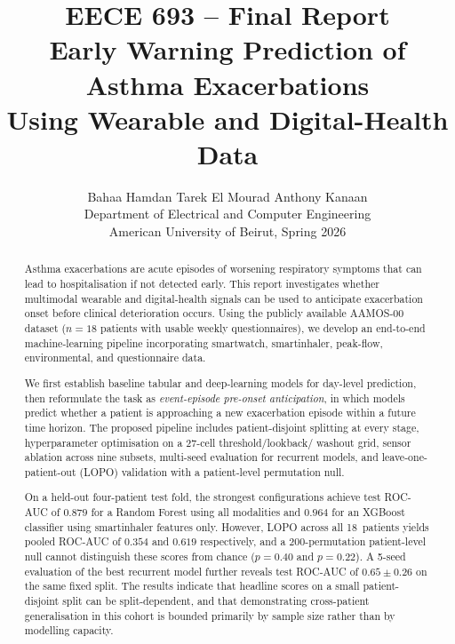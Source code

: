 \documentclass[11pt,a4paper]{article}
\title{%
  \textbf{EECE 693 -- Final Report}\\[6pt]
  \Large Early Warning Prediction of Asthma Exacerbations\\
  Using Wearable and Digital-Health Data}
\author{Bahaa Hamdan \quad Tarek El Mourad \quad Anthony Kanaan\\[2pt]
  Department of Electrical and Computer Engineering\\
  American University of Beirut, Spring 2026}
\date{}
\newcommand{\rocauc}{ROC\nobreakdash-AUC}
\begin{document}
\maketitle

\begin{abstract}
Asthma exacerbations are acute episodes of worsening respiratory
symptoms that can lead to hospitalisation if not detected early.  This
report investigates whether multimodal wearable and digital-health
signals can be used to anticipate exacerbation onset before clinical
deterioration occurs.  Using the publicly available AAMOS-00 dataset
($n=18$ patients with usable weekly questionnaires), we develop an
end-to-end machine-learning pipeline incorporating smartwatch,
smartinhaler, peak-flow, environmental, and questionnaire data.

We first establish baseline tabular and deep-learning models for
day-level prediction, then reformulate the task as \emph{event-episode
pre-onset anticipation}, in which models predict whether a patient is
approaching a new exacerbation episode within a future time horizon.
The proposed pipeline includes patient-disjoint splitting at every
stage, hyperparameter optimisation on a 27-cell threshold/lookback/%
washout grid, sensor ablation across nine subsets, multi-seed
evaluation for recurrent models, and leave-one-patient-out (LOPO)
validation with a patient-level permutation null.

On a held-out four-patient test fold, the strongest configurations
achieve test \rocauc{} of $0.879$ for a Random Forest using all
modalities and $0.964$ for an XGBoost classifier using smartinhaler
features only.  However, LOPO across all 18~patients yields pooled
\rocauc{} of $0.354$ and $0.619$ respectively, and a 200-permutation
patient-level null cannot distinguish these scores from chance
($p=0.40$ and $p=0.22$).  A 5-seed evaluation of the best recurrent
model further reveals test \rocauc{} of $0.65\pm 0.26$ on the same
fixed split.  The results indicate that headline scores on a small
patient-disjoint split can be split-dependent, and that demonstrating
cross-patient generalisation in this cohort is bounded primarily by
sample size rather than by modelling capacity.
\end{abstract}

\tableofcontents

\end{document}
